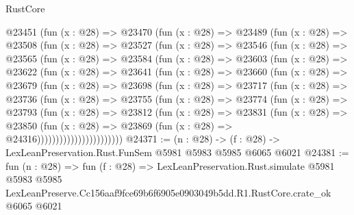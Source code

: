 \begin{lexlean}{RustCore}
\begin{coremodule}
  @23451
    (fun (x : @28) =>
    @23470
      (fun (x : @28) =>
      @23489
        (fun (x : @28) =>
        @23508
          (fun (x : @28) =>
          @23527
            (fun (x : @28) =>
            @23546
              (fun (x : @28) =>
              @23565
                (fun (x : @28) =>
                @23584
                  (fun (x : @28) =>
                  @23603
                    (fun (x : @28) =>
                    @23622
                      (fun (x : @28) =>
                      @23641
                        (fun (x : @28) =>
                        @23660
                          (fun (x : @28) =>
                          @23679
                            (fun (x : @28) =>
                            @23698
                              (fun (x : @28) =>
                              @23717
                                (fun (x : @28) =>
                                @23736
                                  (fun (x : @28) =>
                                  @23755
                                    (fun (x : @28) =>
                                    @23774
                                      (fun (x : @28) =>
                                      @23793
                                        (fun (x : @28) =>
                                        @23812
                                          (fun (x : @28) =>
                                          @23831
                                            (fun (x : @28) =>
                                            @23850
                                              (fun (x : @28) =>
                                              @23869 (fun (x : @28) => @24316)))))))))))))))))))))))
@24371 := (n : @28) -> (f : @28) -> LexLeanPreservation.Rust.FunSem @5981 @5983 @5985 @6065 @6021
@24381 := fun (n : @28) =>
  fun (f : @28) =>
  LexLeanPreservation.Rust.simulate
    @5981
    @5983
    @5985
    LexLeanPreserve.Cc156aaf9fce69b6f6905e0903049b5dd.R1.RustCore.crate_ok
    @6065
    @6021
\end{coremodule}
\end{lexlean}
